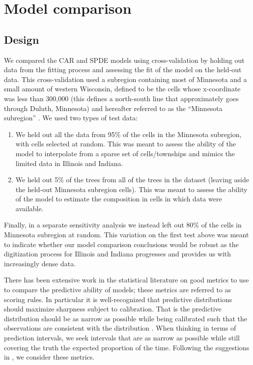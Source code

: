 \documentclass[12pt]{article}\usepackage[]{graphicx}\usepackage[]{color}
\begin{document}
\section{Model comparison}


\subsection{Design}

We compared the CAR and SPDE models using cross-validation by holding
out data from the fitting process and assessing the fit of the model
on the held-out data. This cross-validation used a subregion containing
most of Minnesota and a small amount of western Wisconsin, defined
to be the cells whose x-coordinate was less than 300,000 (this defines
a north-south line that approximately goes through Duluth, Minnesota)
and hereafter referred to as the ``Minnesota subregion'' . We used
two types of test data:
\begin{enumerate}
\item We held out all the data from 95\% of the cells in the Minnesota subregion,
with cells selected at random. This was meant to assess the ability
of the model to interpolate from a sparse set of cells/townships and
mimics the limited data in Illinois and Indiana.
\item We held out 5\% of the trees from all of the trees in the dataset
(leaving aside the held-out Minnesota subregion cells). This was meant
to assess the ability of the model to estimate the composition in
cells in which data were available. 
\end{enumerate}
Finally, in a separate sensitivity analysis we instead left out 80\%
of the cells in Minnesota subregion at random. This variation on the
first test above was meant to indicate whether our model comparison
conclusions would be robust as the digitization process for Illinois
and Indiana progresses and provides us with increasingly dense data. 

There has been extensive work in the statistical literature on good
metrics to use to compare the predictive ability of models; these
metrics are referred to as scoring rules. In particular it is well-recognized
that predictive distributions should maximize sharpness subject to
calibration. That is the predictive distribution should be as narrow
as possible while being calibrated such that the observations are
consistent with the distribution \citep{Gnei:etal:2007}. When thinking
in terms of prediction intervals, we seek intervals that are as narrow
as possible while still covering the truth the expected proportion
of the time. Following the suggestions in \citep{Gnei:etal:2007},
we consider these metrics.
\end{document}
